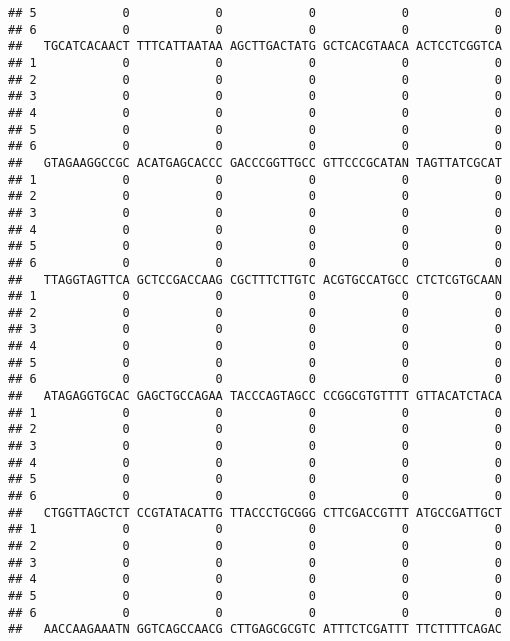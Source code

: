\documentclass[]{article}
\begin{document}
\begin{verbatim}
## 5            0            0            0            0            0
## 6            0            0            0            0            0
##   TGCATCACAACT TTTCATTAATAA AGCTTGACTATG GCTCACGTAACA ACTCCTCGGTCA
## 1            0            0            0            0            0
## 2            0            0            0            0            0
## 3            0            0            0            0            0
## 4            0            0            0            0            0
## 5            0            0            0            0            0
## 6            0            0            0            0            0
##   GTAGAAGGCCGC ACATGAGCACCC GACCCGGTTGCC GTTCCCGCATAN TAGTTATCGCAT
## 1            0            0            0            0            0
## 2            0            0            0            0            0
## 3            0            0            0            0            0
## 4            0            0            0            0            0
## 5            0            0            0            0            0
## 6            0            0            0            0            0
##   TTAGGTAGTTCA GCTCCGACCAAG CGCTTTCTTGTC ACGTGCCATGCC CTCTCGTGCAAN
## 1            0            0            0            0            0
## 2            0            0            0            0            0
## 3            0            0            0            0            0
## 4            0            0            0            0            0
## 5            0            0            0            0            0
## 6            0            0            0            0            0
##   ATAGAGGTGCAC GAGCTGCCAGAA TACCCAGTAGCC CCGGCGTGTTTT GTTACATCTACA
## 1            0            0            0            0            0
## 2            0            0            0            0            0
## 3            0            0            0            0            0
## 4            0            0            0            0            0
## 5            0            0            0            0            0
## 6            0            0            0            0            0
##   CTGGTTAGCTCT CCGTATACATTG TTACCCTGCGGG CTTCGACCGTTT ATGCCGATTGCT
## 1            0            0            0            0            0
## 2            0            0            0            0            0
## 3            0            0            0            0            0
## 4            0            0            0            0            0
## 5            0            0            0            0            0
## 6            0            0            0            0            0
##   AACCAAGAAATN GGTCAGCCAACG CTTGAGCGCGTC ATTTCTCGATTT TTCTTTTCAGAC

\end{verbatim}
\end{document}
